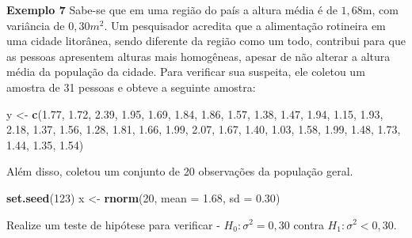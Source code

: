 \documentclass[10pt,a4paper]{book}
\newenvironment{Shaded}{\begin{snugshade}}{\end{snugshade}}
\newcommand{\KeywordTok}[1]{\textcolor[rgb]{0.13,0.29,0.53}{\textbf{#1}}}
\newcommand{\DataTypeTok}[1]{\textcolor[rgb]{0.13,0.29,0.53}{#1}}
\newcommand{\DecValTok}[1]{\textcolor[rgb]{0.00,0.00,0.81}{#1}}
\newcommand{\FloatTok}[1]{\textcolor[rgb]{0.00,0.00,0.81}{#1}}
\newcommand{\StringTok}[1]{\textcolor[rgb]{0.31,0.60,0.02}{#1}}
\newcommand{\NormalTok}[1]{#1}
\begin{document}
\textbf{Exemplo 7} Sabe-se que em uma região do país a altura média é de
\(1,68\)m, com variância de \(0,30m^2\). Um pesquisador acredita que a
alimentação rotineira em uma cidade litorânea, sendo diferente da região
como um todo, contribui para que as pessoas apresentem alturas mais
homogêneas, apesar de não alterar a altura média da população da cidade.
Para verificar sua suspeita, ele coletou um amostra de 31 pessoas e
obteve a seguinte amostra:

\begin{Shaded}
\begin{Highlighting}[]
\NormalTok{y <-}\StringTok{ }\KeywordTok{c}\NormalTok{(}\FloatTok{1.77}\NormalTok{, }\FloatTok{1.72}\NormalTok{, }\FloatTok{2.39}\NormalTok{, }\FloatTok{1.95}\NormalTok{, }\FloatTok{1.69}\NormalTok{, }\FloatTok{1.84}\NormalTok{, }\FloatTok{1.86}\NormalTok{, }\FloatTok{1.57}\NormalTok{, }\FloatTok{1.38}\NormalTok{, }\FloatTok{1.47}\NormalTok{, }\FloatTok{1.94}\NormalTok{, }
       \FloatTok{1.15}\NormalTok{, }\FloatTok{1.93}\NormalTok{, }\FloatTok{2.18}\NormalTok{, }\FloatTok{1.37}\NormalTok{, }\FloatTok{1.56}\NormalTok{, }\FloatTok{1.28}\NormalTok{, }\FloatTok{1.81}\NormalTok{, }\FloatTok{1.66}\NormalTok{, }\FloatTok{1.99}\NormalTok{, }\FloatTok{2.07}\NormalTok{, }\FloatTok{1.67}\NormalTok{, }
       \FloatTok{1.40}\NormalTok{, }\FloatTok{1.03}\NormalTok{, }\FloatTok{1.58}\NormalTok{, }\FloatTok{1.99}\NormalTok{, }\FloatTok{1.48}\NormalTok{, }\FloatTok{1.73}\NormalTok{, }\FloatTok{1.44}\NormalTok{, }\FloatTok{1.35}\NormalTok{, }\FloatTok{1.54}\NormalTok{)}
\end{Highlighting}
\end{Shaded}

Além disso, coletou um conjunto de 20 observações da população geral.

\begin{Shaded}
\begin{Highlighting}[]
\KeywordTok{set.seed}\NormalTok{(}\DecValTok{123}\NormalTok{)}
\NormalTok{x <-}\StringTok{ }\KeywordTok{rnorm}\NormalTok{(}\DecValTok{20}\NormalTok{, }\DataTypeTok{mean =} \FloatTok{1.68}\NormalTok{, }\DataTypeTok{sd =} \FloatTok{0.30}\NormalTok{)}
\end{Highlighting}
\end{Shaded}

Realize um teste de hipótese para verificar - \(H_0: \sigma^2 = 0,30\)
contra \(H_1: \sigma^2 < 0,30\).
\end{document}
